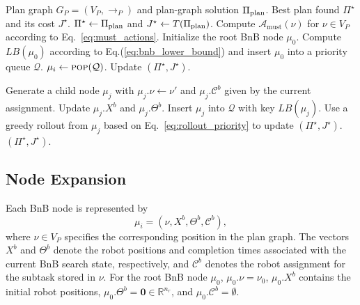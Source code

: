 \documentclass[lettersize,journal]{IEEEtran}
\theoremstyle{italiclemma}
\theoremstyle{italiclemma}
\theoremstyle{definition}
\begin{document}
\begin{algorithm}[t]
\caption{\textsc{BnB\_Optimization}}
\label{alg:bnb}
\begin{algorithmic}[1]
\REQUIRE Plan graph $G_P=(V_P,\rightarrow_P)$ and plan-graph solution $\Pi_{\rm plan}$.
\ENSURE Best plan found $\Pi^\star$ and its cost $J^\star$.
\STATE $\Pi^\star\gets\Pi_{\rm plan}$ and
$J^\star\gets T(\Pi_{\rm plan})$.
\STATE Compute $\mathcal A_{\mathrm{must}}(\nu)$ for
$\nu\in V_P$ according to Eq.~\eqref{eq:must_actions}.
\STATE Initialize the root BnB node $\mu_0$.
\STATE Compute $LB(\mu_0)$ according to Eq.(\ref{eq:bnb_lower_bound}) and insert $\mu_0$ into a priority queue $\mathcal{Q}$.
    \STATE $\mu_i\gets\textsc{pop}(\mathcal Q)$.    
        \STATE {}
    \ENDIF
            \STATE Update $(\Pi^\star,J^\star)$.
        \ENDIF
        \STATE {}
    \ENDIF

            \STATE Generate a child node $\mu_j$ with
            $\mu_j.\nu\gets\nu'$ and $\mu_j.\mathcal C^b$ given by the current assignment.
            \STATE  Update $\mu_j.X^b$ and $\mu_j.\Theta^b$.
                \STATE {}
            \ENDIF
                \STATE Insert $\mu_j$ into $\mathcal Q$ with key
                $LB(\mu_j)$.
            \ENDIF
            \STATE Use a greedy rollout from $\mu_j$ based on Eq.~\eqref{eq:rollout_priority} to update $(\Pi^\star,J^\star)$.
        \ENDFOR
    \ENDFOR
\ENDWHILE
\RETURN $(\Pi^\star,J^\star)$.
\end{algorithmic}
\end{algorithm}

\subsection{Node Expansion}

Each BnB node is represented by
$$
\mu_i=(\nu,X^b,\Theta^b,\mathcal C^b),
$$
where $\nu\in V_P$ specifies the corresponding position in the plan graph. The vectors $X^b$ and $\Theta^b$ denote the robot positions and completion times associated with the current BnB search state, respectively, and $\mathcal C^b$ denotes the robot assignment for the subtask stored in $\nu$. For the root BnB node $\mu_0$, $\mu_0.\nu  = \nu_0$, $\mu_0.X^b$ contains the initial robot positions,
$\mu_0.\Theta^b=\mathbf{0}\in\mathbb{R}^{n_r}$, and $\mu_0.\mathcal C^b=\emptyset$.
\end{document}
